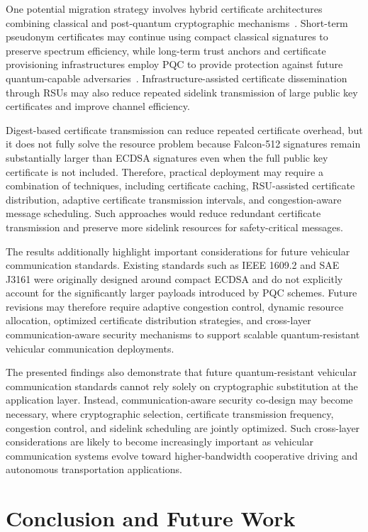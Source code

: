\documentclass[conference]{IEEEtran}
\begin{document}
One potential migration strategy involves hybrid certificate architectures combining classical and post-quantum cryptographic mechanisms~\cite{mamun_pqc}. Short-term pseudonym certificates may continue using compact classical signatures to preserve spectrum efficiency, while long-term trust anchors and certificate provisioning infrastructures employ PQC to provide protection against future quantum-capable adversaries~\cite{twardokus2024cryptography}. Infrastructure-assisted certificate dissemination through RSUs may also reduce repeated sidelink transmission of large public key certificates and improve channel efficiency.

Digest-based certificate transmission can reduce repeated certificate overhead, but it does not fully solve the resource problem because Falcon-512 signatures remain substantially larger than ECDSA signatures even when the full public key certificate is not included. Therefore, practical deployment may require a combination of techniques, including certificate caching, RSU-assisted certificate distribution, adaptive certificate transmission intervals, and congestion-aware message scheduling. Such approaches would reduce redundant certificate transmission and preserve more sidelink resources for safety-critical messages.

The results additionally highlight important considerations for future vehicular communication standards. Existing standards such as IEEE 1609.2 and SAE J3161 were originally designed around compact ECDSA and do not explicitly account for the significantly larger payloads introduced by PQC schemes. Future revisions may therefore require adaptive congestion control, dynamic resource allocation, optimized certificate distribution strategies, and cross-layer communication-aware security mechanisms to support scalable quantum-resistant vehicular communication deployments.

The presented findings also demonstrate that future quantum-resistant vehicular communication standards cannot rely solely on cryptographic substitution at the application layer. Instead, communication-aware security co-design may become necessary, where cryptographic selection, certificate transmission frequency, congestion control, and sidelink scheduling are jointly optimized. Such cross-layer considerations are likely to become increasingly important as vehicular communication systems evolve toward higher-bandwidth cooperative driving and autonomous transportation applications.

\section{Conclusion and Future Work}
\end{document}
